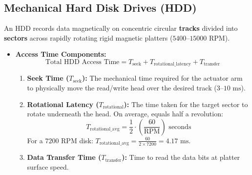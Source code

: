 \subsection{Mechanical Hard Disk Drives (HDD)}
An HDD records data magnetically on concentric circular \textbf{tracks} divided into \textbf{sectors} across rapidly rotating rigid magnetic platters ($5400$--$15000\text{ RPM}$).
\begin{itemize}
    \item \textbf{Access Time Components:}
    \begin{equation}
    \label{eq:hdd_access_time}
    \text{Total HDD Access Time} = T_{\text{seek}} + T_{\text{rotational\_latency}} + T_{\text{transfer}}
    \end{equation}
    \begin{enumerate}[label=\bfseries\alph*.]
        \item \textbf{Seek Time ($T_{\text{seek}}$):} The mechanical time required for the actuator arm to physically move the read/write head over the desired track ($3$--$10\text{ ms}$).
        \item \textbf{Rotational Latency ($T_{\text{rotational}}$):} The time taken for the target sector to rotate underneath the head. On average, equals half a revolution:
        \begin{equation}
        \label{eq:rotational_latency}
        T_{\text{rotational\_avg}} = \frac{1}{2} \cdot \left( \frac{60}{\text{RPM}} \right) \text{ seconds}
        \end{equation}
        For a $7200\text{ RPM}$ disk: $T_{\text{rotational\_avg}} = \frac{60}{2 \times 7200} = 4.17\text{ ms}$.
        \item \textbf{Data Transfer Time ($T_{\text{transfer}}$):} Time to read the data bits at platter surface speed.
    \end{enumerate}
\end{itemize}

